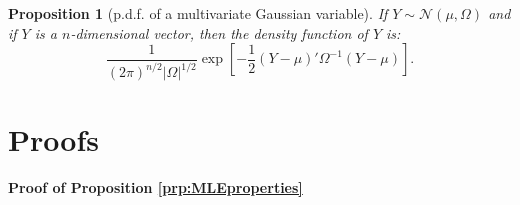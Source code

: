 \documentclass[
  12pt,
]{book}
\newtheorem{proposition}{Proposition}[chapter]
\theoremstyle{definition}
\theoremstyle{definition}
\theoremstyle{definition}
\theoremstyle{definition}
\theoremstyle{remark}
\begin{document}
\begin{proposition}[p.d.f. of a multivariate Gaussian variable]
\protect\hypertarget{prp:pdfMultivarGaussian}{}\label{prp:pdfMultivarGaussian}If \(Y \sim \mathcal{N}(\mu,\Omega)\) and if \(Y\) is a \(n\)-dimensional vector, then the density function of \(Y\) is:
\[
\frac{1}{(2 \pi)^{n/2}|\Omega|^{1/2}}\exp\left[-\frac{1}{2}\left(Y-\mu\right)'\Omega^{-1}\left(Y-\mu\right)\right].
\]
\end{proposition}

\hypertarget{AppendixProof}{%
\section{Proofs}\label{AppendixProof}}

\textbf{Proof of Proposition \ref{prp:MLEproperties}}
\end{document}
